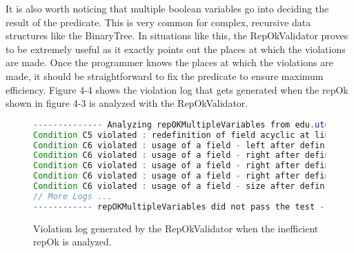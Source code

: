 \par
It is also worth noticing that multiple boolean variables go into deciding the result of the predicate. This is very common for complex, recursive data structures like the BinaryTree. In situations like this, the RepOkValidator proves to be extremely useful as it exactly points out the places at which the violations are made. Once the programmer knows the places at which the violations are made, it should be straightforward to fix the predicate to ensure maximum efficiency. Figure 4-4 shows the violation log that gets generated when the repOk shown in figure 4-3 is analyzed with the RepOkValidator.

\begin{figure}
\centering
\begin{lstlisting}[language=Java]
-------------- Analyzing repOKMultipleVariables from edu.utexas.BinaryTree ------------
Condition C5 violated : redefinition of field acyclic at line 91 inside repOKMultipleVariables in edu.utexas.BinaryTree.java
Condition C6 violated : usage of a field - left after defining return value from class edu.utexas.BinaryTree$Node at line 87 inside repOKMultipleVariables in edu.utexas.BinaryTree.java
Condition C6 violated : usage of a field - right after defining return value from class edu.utexas.BinaryTree$Node at line 89 inside repOKMultipleVariables in edu.utexas.BinaryTree.java
Condition C6 violated : usage of a field - right after defining return value from class edu.utexas.BinaryTree$Node at line 90 inside repOKMultipleVariables in edu.utexas.BinaryTree.java
Condition C6 violated : usage of a field - right after defining return value from class edu.utexas.BinaryTree$Node at line 92 inside repOKMultipleVariables in edu.utexas.BinaryTree.java
Condition C6 violated : usage of a field - size after defining return value from class edu.utexas.BinaryTree at line 96 inside repOKMultipleVariables in edu.utexas.BinaryTree.java
// More Logs ...
------------ repOKMultipleVariables did not pass the test ------------
\end{lstlisting}
\caption{Violation log generated by the RepOkValidator when the inefficient repOk is analyzed.}
\label{fig:repOkKoratSatisfyEfficiencyLog}
\end{figure}
